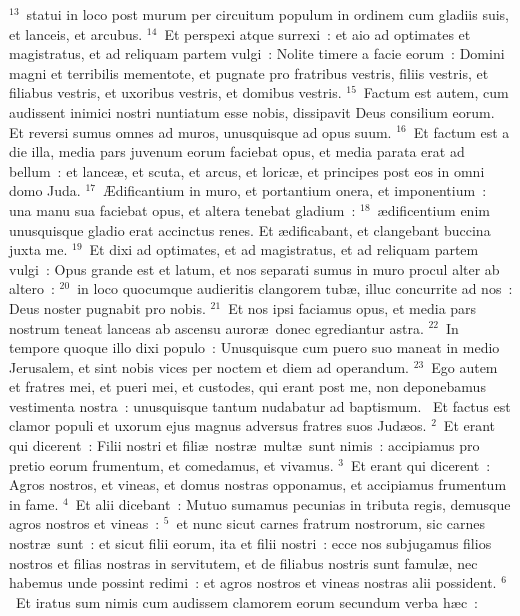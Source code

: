 ${}^{13}$~statui in loco post murum per circuitum populum in ordinem cum gladiis suis, et lanceis, et arcubus.
${}^{14}$~Et perspexi atque surrexi~: et aio ad optimates et magistratus, et ad reliquam partem vulgi~: Nolite timere a facie eorum~: Domini magni et terribilis mementote, et pugnate pro fratribus vestris, filiis vestris, et filiabus vestris, et uxoribus vestris, et domibus vestris.
${}^{15}$~Factum est autem, cum audissent inimici nostri nuntiatum esse nobis, dissipavit Deus consilium eorum. Et reversi sumus omnes ad muros, unusquisque ad opus suum.
${}^{16}$~Et factum est a die illa, media pars juvenum eorum faciebat opus, et media parata erat ad bellum~: et lance\ae , et scuta, et arcus, et loric\ae , et principes post eos in omni domo Juda.
${}^{17}$~\AE dificantium in muro, et portantium onera, et imponentium~: una manu sua faciebat opus, et altera tenebat gladium~:
${}^{18}$~\ae dificentium enim unusquisque gladio erat accinctus renes. Et \ae dificabant, et clangebant buccina juxta me.
${}^{19}$~Et dixi ad optimates, et ad magistratus, et ad reliquam partem vulgi~: Opus grande est et latum, et nos separati sumus in muro procul alter ab altero~:
${}^{20}$~in loco quocumque audieritis clangorem tub\ae , illuc concurrite ad nos~: Deus noster pugnabit pro nobis.
${}^{21}$~Et nos ipsi faciamus opus, et media pars nostrum teneat lanceas ab ascensu auror\ae\ donec egrediantur astra.
${}^{22}$~In tempore quoque illo dixi populo~: Unusquisque cum puero suo maneat in medio Jerusalem, et sint nobis vices per noctem et diem ad operandum.
${}^{23}$~Ego autem et fratres mei, et pueri mei, et custodes, qui erant post me, non deponebamus vestimenta nostra~: unusquisque tantum nudabatur ad baptismum.
~Et factus est clamor populi et uxorum ejus magnus adversus fratres suos Jud\ae os.
${}^{2}$~Et erant qui dicerent~: Filii nostri et fili\ae\ nostr\ae\ mult\ae\ sunt nimis~: accipiamus pro pretio eorum frumentum, et comedamus, et vivamus.
${}^{3}$~Et erant qui dicerent~: Agros nostros, et vineas, et domus nostras opponamus, et accipiamus frumentum in fame.
${}^{4}$~Et alii dicebant~: Mutuo sumamus pecunias in tributa regis, demusque agros nostros et vineas~:
${}^{5}$~et nunc sicut carnes fratrum nostrorum, sic carnes nostr\ae\ sunt~: et sicut filii eorum, ita et filii nostri~: ecce nos subjugamus filios nostros et filias nostras in servitutem, et de filiabus nostris sunt famul\ae , nec habemus unde possint redimi~: et agros nostros et vineas nostras alii possident.
${}^{6}$~Et iratus sum nimis cum audissem clamorem eorum secundum verba h\ae c~:
